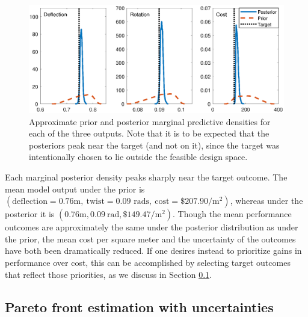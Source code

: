 \documentclass[12pt]{article}
\begin{document}
\begin{figure}
\centering
\includegraphics[scale=0.8]{FIG_prior_vs_posterior_dist}
\caption{Approximate prior and posterior marginal predictive densities for each of the three outputs. Note that it is to be expected that the posteriors peak near the target (and not on it), since the target was intentionally chosen to lie outside the feasible design space.}
\label{fig:prior_post_pred_comp}
\end{figure}
%
Each marginal posterior density peaks sharply near the target outcome.
%
The mean model output under the prior is $(\text{deflection}=0.76\mathrm m,\ \text{twist}=0.09\text{ rads},\ \text{cost}=\$207.90/\mathrm m^2)$, whereas under the posterior it is $(0.76\mathrm m,0.09\ \mathrm{rad},\$149.47/\mathrm m^2)$.
%
Though the mean performance outcomes are approximately the same under the posterior distribution as under the prior, the mean cost per square meter and the uncertainty of the outcomes have both been dramatically reduced.
%
If one desires instead to prioritize gains in performance over cost, this can be accomplished by selecting target outcomes that reflect those priorities, as we discuss in Section \ref{removing_cal_pars}. 

\subsection{Pareto front estimation with uncertainties}\label{removing_cal_pars}

\end{document}

